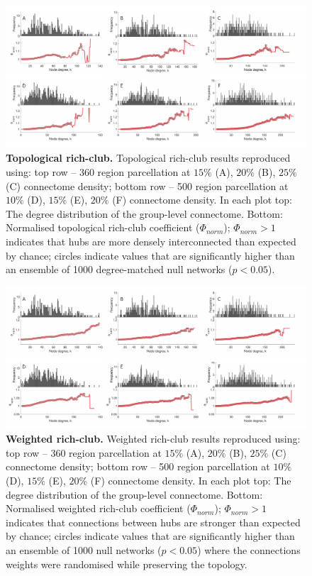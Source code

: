 \begin{figure}[h!]
\begin{center}
\includegraphics[width=1\textwidth]{Chapter5/SFigure1.pdf}%
\end{center}
\caption{\textbf{Topological rich-club.}
Topological rich-club results reproduced using: top row -- 360 region parcellation at $15\%$ (A), $20\%$ (B), $25\%$ (C) connectome density; bottom row -- 500 region parcellation at $10\%$ (D), $15\%$ (E), $20\%$ (F) connectome density. In each plot top: The degree distribution of the group-level connectome. Bottom: Normalised topological rich-club coefficient ($\Phi_{norm}$); $\Phi_{norm}>1$ indicates that hubs are more densely interconnected than expected by chance; circles indicate values that are significantly higher than an ensemble of 1000 degree-matched null networks ($p<0.05$).}
\label{fig:Ch5SFig1}
\end{figure}

\begin{figure}[h!]
\begin{center}
\includegraphics[width=1\textwidth]{Chapter5/SFigure2.pdf}%
\end{center}
\caption{\textbf{Weighted rich-club.}
Weighted rich-club results reproduced using: top row -- 360 region parcellation at $15\%$ (A), $20\%$ (B), $25\%$ (C) connectome density; bottom row -- 500 region parcellation at $10\%$ (D), $15\%$ (E), $20\%$ (F) connectome density. In each plot top: The degree distribution of the group-level connectome. Bottom: Normalised weighted rich-club coefficient ($\Phi_{norm}$); $\Phi_{norm}>1$ indicates that connections between hubs are stronger than expected by chance; circles indicate values that are significantly higher than an ensemble of 1000 null networks ($p<0.05$) where the connections weights were randomised while preserving the topology. }
\label{fig:Ch5SFig2}
\end{figure}

